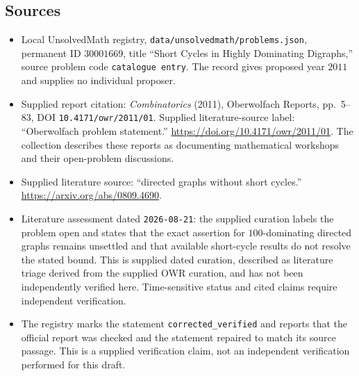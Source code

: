 \documentclass[11pt]{article}
\begin{document}
\subsection{Sources}
\begin{itemize}
\item Local UnsolvedMath registry, \texttt{data/unsolvedmath/problems.json}, permanent ID \(30001669\), title ``Short Cycles in Highly Dominating Digraphs,'' source problem code \texttt{catalogue entry}. The record gives proposed year \(2011\) and supplies no individual proposer.
\item Supplied report citation: \emph{Combinatorics} (2011), Oberwolfach Reports, pp.\ 5--83, DOI \texttt{10.4171/owr/2011/01}. Supplied literature-source label: ``Oberwolfach problem statement.'' \url{https://doi.org/10.4171/owr/2011/01}. The collection describes these reports as documenting mathematical workshops and their open-problem discussions.
\item Supplied literature source: ``directed graphs without short cycles.'' \url{https://arxiv.org/abs/0809.4690}.
\item Literature assessment dated \texttt{2026-08-21}: the supplied curation labels the problem open and states that the exact assertion for \(100\)-dominating directed graphs remains unsettled and that available short-cycle results do not resolve the stated bound. This is supplied dated curation, described as literature triage derived from the supplied OWR curation, and has not been independently verified here. Time-sensitive status and cited claims require independent verification.
\item The registry marks the statement \texttt{corrected\_verified} and reports that the official report was checked and the statement repaired to match its source passage. This is a supplied verification claim, not an independent verification performed for this draft.
\end{itemize}
\end{document}
